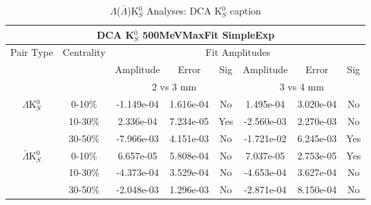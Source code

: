 \documentclass[../AnalysisNoteJBuxton.tex]{subfiles}
\begin{document}
\begin{table}
 \centering
 \begin{tabular}{|c|c|c|c|c||c|c|c|}
  \multicolumn{8}{c}{DCA K$^{0}_{S}$ 500MeVMaxFit SimpleExp} \\
  \hline
  \multirow{3}{*}{Pair Type} & \multirow{3}{*}{Centrality} & \multicolumn{6}{c|}{Fit Amplitudes} \\
  \cline{3-8}
   & & Amplitude & Error & Sig & Amplitude & Error & Sig \\  
  \cline{3-8}
   & & \multicolumn{3}{c||}{2 vs 3 mm} & \multicolumn{3}{c|}{3 vs 4 mm} \\  
  \hline  
  \multirow{3}{*}{$\Lambda$K$^{0}_{S}$}  
   &  0-10\% & -1.149e-04 & 1.616e-04 & No & 1.495e-04 & 3.020e-04 & No \\
   & 10-30\% & 2.336e-04 & 7.234e-05 & Yes & -2.560e-03 & 2.270e-03 & No \\
   & 30-50\% & -7.966e-03 & 4.151e-03 & No & -1.721e-02 & 6.245e-03 & Yes \\
  \hline  
  \multirow{3}{*}{$\bar{\Lambda}$K$^{0}_{S}$}  
   &  0-10\% & 6.657e-05 & 5.808e-04 & No & 7.037e-05 & 2.753e-05 & Yes \\
   & 10-30\% & -4.373e-04 & 3.529e-04 & No & -4.653e-04 & 3.627e-04 & No \\
   & 30-50\% & -2.048e-03 & 1.296e-03 & No & -2.871e-04 & 8.150e-04 & No \\
  \hline
 \end{tabular}
 \caption{$\Lambda$($\bar{\Lambda}$)K$^{0}_{S}$ Analyses: DCA K$^{0}_{S}$ caption}
 \label{tab:K0DcaLamK0_500MeVMaxFit_SimpleExp}
\end{table}




\clearpage
\end{document}
